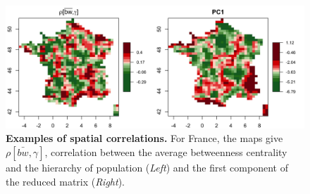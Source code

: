 \documentclass[11pt]{article}
\begin{document}
\begin{figure}
\includegraphics[width=\linewidth]{4-1-3-fig-staticcorrs-mapscorrs}
\caption{\textbf{Examples of spatial correlations.} For France, the maps give $\rho\left[\bar{bw},\gamma\right]$, correlation between the average betweenness centrality and the hierarchy of population (\textit{Left}) and the first component of the reduced matrix (\textit{Right}).\label{fig:staticcorrs:mapscorrs}}
\end{figure}
\end{document}
